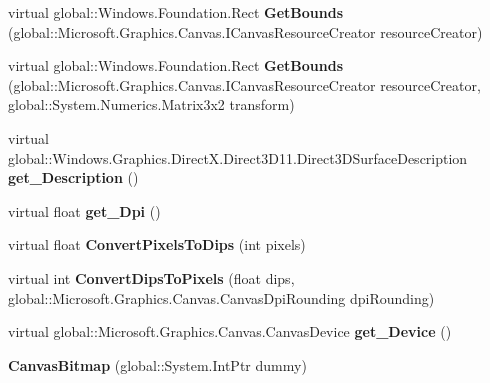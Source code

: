 \begin{DoxyCompactItemize}
\item 
\mbox{\label{class_microsoft_1_1_graphics_1_1_canvas_1_1_canvas_bitmap_a8b7155d2c58fbb8167dbdb9bf0d24f40}} 
virtual global\+::\+Windows.\+Foundation.\+Rect {\bfseries Get\+Bounds} (global\+::\+Microsoft.\+Graphics.\+Canvas.\+I\+Canvas\+Resource\+Creator resource\+Creator)
\item 
\mbox{\label{class_microsoft_1_1_graphics_1_1_canvas_1_1_canvas_bitmap_a12c526eb447c88ab11afffd320e1511e}} 
virtual global\+::\+Windows.\+Foundation.\+Rect {\bfseries Get\+Bounds} (global\+::\+Microsoft.\+Graphics.\+Canvas.\+I\+Canvas\+Resource\+Creator resource\+Creator, global\+::\+System.\+Numerics.\+Matrix3x2 transform)
\item 
\mbox{\label{class_microsoft_1_1_graphics_1_1_canvas_1_1_canvas_bitmap_adbae6cf16736de995445a0e9d2e00511}} 
virtual global\+::\+Windows.\+Graphics.\+Direct\+X.\+Direct3\+D11.\+Direct3\+D\+Surface\+Description {\bfseries get\+\_\+\+Description} ()
\item 
\mbox{\label{class_microsoft_1_1_graphics_1_1_canvas_1_1_canvas_bitmap_a036cc2f1feacbee8069bc29472eef2ca}} 
virtual float {\bfseries get\+\_\+\+Dpi} ()
\item 
\mbox{\label{class_microsoft_1_1_graphics_1_1_canvas_1_1_canvas_bitmap_aaeef506401f2494157b1c143d3846e0b}} 
virtual float {\bfseries Convert\+Pixels\+To\+Dips} (int pixels)
\item 
\mbox{\label{class_microsoft_1_1_graphics_1_1_canvas_1_1_canvas_bitmap_a0f0828753af0e3ad633e67fd3552f3e0}} 
virtual int {\bfseries Convert\+Dips\+To\+Pixels} (float dips, global\+::\+Microsoft.\+Graphics.\+Canvas.\+Canvas\+Dpi\+Rounding dpi\+Rounding)
\item 
\mbox{\label{class_microsoft_1_1_graphics_1_1_canvas_1_1_canvas_bitmap_aeac60d19e76342788c96babbe98c63fb}} 
virtual global\+::\+Microsoft.\+Graphics.\+Canvas.\+Canvas\+Device {\bfseries get\+\_\+\+Device} ()
\item 
\mbox{\label{class_microsoft_1_1_graphics_1_1_canvas_1_1_canvas_bitmap_a9af813ca96be7e3caebb58d13fd31eaa}} 
{\bfseries Canvas\+Bitmap} (global\+::\+System.\+Int\+Ptr dummy)
\end{DoxyCompactItemize}
